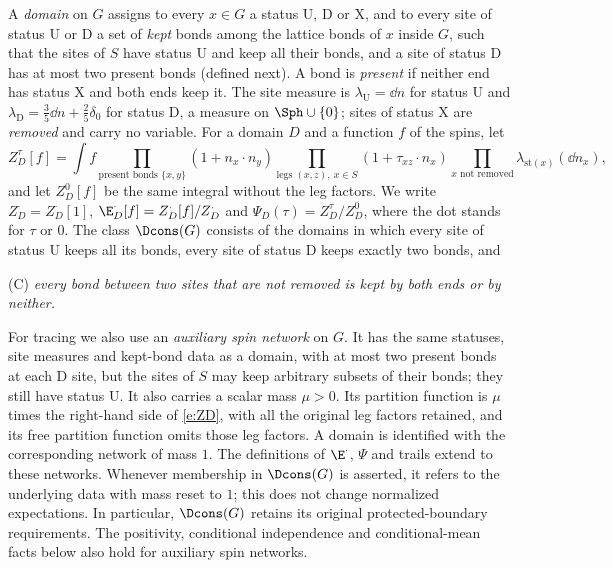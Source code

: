 \begin{definition}\label{d:domain}
A \emph{domain} on $G$ assigns to every $x \in G$ a status $\mathrm{U}$, $\mathrm{D}$ or $\mathrm{X}$, and to every site of status $\mathrm U$ or $\mathrm D$ a set of \emph{kept} bonds among the lattice bonds of $x$ inside $G$, such that the sites of $S$ have status $\mathrm U$ and keep all their bonds, and a site of status $\mathrm D$ has at most two present bonds (defined next). A bond is \emph{present} if neither end has status $\mathrm X$ and both ends keep it. The site measure is $\lambda_{\mathrm U} = \dd n$ for status $\mathrm U$ and $\lambda_{\mathrm D} = \frac35 \dd n + \frac25 \delta_0$ for status $\mathrm D$, a measure on $\Sph \cup \{0\}$; sites of status $\mathrm X$ are \emph{removed} and carry no variable. For a domain $D$ and a function $f$ of the spins, let
\begin{equation}\label{e:ZD}
Z^\tau_D[f] = \int f \prod_{\text{present bonds } \{x, y\}} (1 + n_x \cdot n_y) \prod_{\text{legs } (x, z), \ x \in S} (1 + \tau_{xz} \cdot n_x) \prod_{x \text{ not removed}} \lambda_{\mathrm{st}(x)}(\dd n_x),
\end{equation}
and let $Z^0_D[f]$ be the same integral without the leg factors. We write $Z^\cdot_D = Z^\cdot_D[1]$, $\E^\cdot_D[f] = Z^\cdot_D[f] / Z^\cdot_D$ and $\Psi_D(\tau) = Z^\tau_D / Z^0_D$, where the dot stands for $\tau$ or $0$. The class $\Dcons(G)$ consists of the domains in which every site of status $\mathrm U$ keeps all its bonds, every site of status $\mathrm D$ keeps exactly two bonds, and

(C) \emph{every bond between two sites that are not removed is kept by both ends or by neither.}
\end{definition}
For tracing we also use an \emph{auxiliary spin network} on $G$. It has
the same statuses, site measures and kept-bond data as a domain, with at
most two present bonds at each $\mathrm D$ site, but the sites of $S$
may keep arbitrary subsets of their bonds; they still have status
$\mathrm U$. It also carries a scalar mass $\mu>0$. Its partition
function is $\mu$ times the right-hand side of \eqref{e:ZD}, with all
the original leg factors retained, and its free partition function omits
those leg factors. A domain is identified with the corresponding network
of mass $1$. The definitions of $\E^\cdot$, $\Psi$ and trails extend to
these networks. Whenever membership in $\Dcons(G)$ is asserted, it refers
to the underlying data with mass reset to $1$; this does not change
normalized expectations. In particular, $\Dcons(G)$ retains its original
protected-boundary requirements. The positivity, conditional independence
and conditional-mean facts below also hold for auxiliary spin networks.

